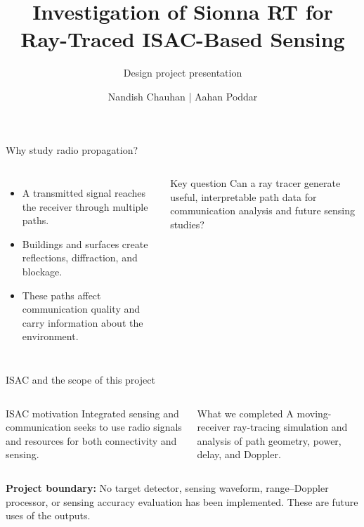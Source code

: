 \documentclass[aspectratio=169,10pt]{beamer}
\title[Investigation of Sionna RT]{Investigation of Sionna RT for\\Ray-Traced ISAC-Based Sensing}
\subtitle{Design project presentation}
\author{Nandish Chauhan \quad | \quad Aahan Poddar}
\institute{Indian Institute of Information Technology Vadodara\\[4pt]\small Under the guidance of Dr. Bhupendra Kumar}
\date{}
\begin{document}
\begin{frame}[plain]
\titlepage
\end{frame}

\begin{frame}{Why study radio propagation?}
\begin{columns}[T,onlytextwidth]
\begin{itemize}\setlength\itemsep{10pt}
\item A transmitted signal reaches the receiver through multiple paths.
\item Buildings and surfaces create reflections, diffraction, and blockage.
\item These paths affect communication quality and carry information about the environment.
\end{itemize}
\begin{block}{Key question}
Can a ray tracer generate useful, interpretable path data for communication analysis and future sensing studies?
\end{block}
\end{columns}
\end{frame}

\begin{frame}{ISAC and the scope of this project}
\begin{columns}[T,onlytextwidth]
\begin{block}{ISAC motivation}
Integrated sensing and communication seeks to use radio signals and resources for both connectivity and sensing.
\end{block}
\begin{block}{What we completed}
A moving-receiver ray-tracing simulation and analysis of path geometry, power, delay, and Doppler.
\end{block}
\end{columns}
\vspace{9pt}
\textbf{Project boundary:} No target detector, sensing waveform, range--Doppler processor, or sensing accuracy evaluation has been implemented. These are future uses of the outputs.
\end{frame}
\end{document}
